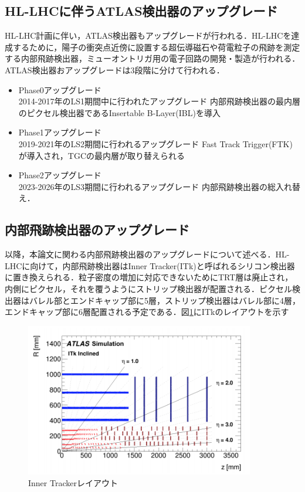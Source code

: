 \subsection{HL-LHCに伴うATLAS検出器のアップグレード}
HL-LHC計画に伴い，ATLAS検出器もアップグレードが行われる．HL-LHCを達成するために，陽子の衝突点近傍に設置する超伝導磁石や荷電粒子の飛跡を測定する内部飛跡検出器，ミューオントリガ用の電子回路の開発・製造が行われる．ATLAS検出器おアップグレードは3段階に分けて行われる．

\begin{itemize}
\item Phase0アップグレード\\
2014-2017年のLS1期間中に行われたアップグレード
内部飛跡検出器の最内層のピクセル検出器であるInsertable B-Layer(IBL)を導入
\item Phase1アップグレード\\
2019-2021年のLS2期間に行われるアップグレード
Fast Track Trigger(FTK)が導入され，TGCの最内層が取り替えられる
\item Phase2アップグレード\\
2023-2026年のLS3期間に行われるアップグレード
内部飛跡検出器の総入れ替え．
\end{itemize}



\subsection{内部飛跡検出器のアップグレード}
以降，本論文に関わる内部飛跡検出器のアップグレードについて述べる．HL-LHCに向けて，内部飛跡検出器はInner Tracker(ITk)と呼ばれるシリコン検出器に置き換えられる．粒子密度の増加に対応できないためにTRT層は廃止され，内側にピクセル，それを覆うようにストリップ検出器が配置される．ピクセル検出器はバレル部とエンドキャップ部に5層，ストリップ検出器はバレル部に4層，エンドキャップ部に6層配置される予定である．図\ref{fig:ITkview}にITkのレイアウトを示す\par

\begin{figure}[h]
  \centering
  \includegraphics[width=10cm]{./figure/ITkview.png}
  \caption{Inner Trackerレイアウト\cite{Collaboration:2285585}}
  \label{fig:ITkview}
\end{figure}


